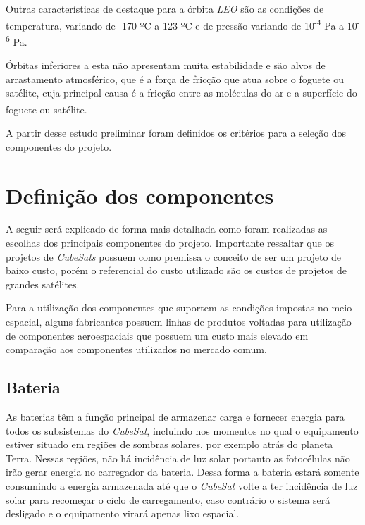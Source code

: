 \documentclass[
	12pt,				%
	openright,			%
	oneside,			%
	a4paper,			%
	english,			%
	french,				%
	spanish,			%
	brazil,				%
	oldfontcommands
	]{abntex2}
\begin{document}
	Outras características de destaque para a órbita \textit{LEO} são as condições de temperatura, variando de -170 ºC a 123 ºC e de pressão variando de 10\textsuperscript{-4} Pa a 10\textsuperscript{-6} Pa.\textsuperscript{\cite{LEO}}
	
	Órbitas inferiores a esta não apresentam muita estabilidade e são alvos de arrastamento atmosférico, que é a força de fricção que atua sobre o foguete ou satélite, cuja principal causa é a fricção entre as moléculas do ar e a superfície do foguete ou satélite.\textsuperscript{\cite{NASA2}}
	
	A partir desse estudo preliminar foram definidos os critérios para a seleção dos componentes do projeto.	
	
\section[Definição dos componentes]{Definição dos componentes}

	A seguir será explicado de forma mais detalhada como foram realizadas as escolhas dos principais componentes do projeto. Importante ressaltar que os projetos de \textit{CubeSats} possuem como premissa o conceito de ser um projeto de baixo custo, porém o referencial do custo utilizado são os custos de projetos de grandes satélites.
	
	Para a utilização dos componentes que suportem as condições impostas  no meio espacial, alguns fabricantes possuem linhas de produtos voltadas para utilização de componentes aeroespaciais que possuem um custo mais elevado em comparação aos componentes utilizados no mercado comum.

\subsection[Bateria]{Bateria} \label{Sec_Bateria}

	
	As baterias têm a função principal de armazenar carga e fornecer energia para todos os subsistemas do \textit{CubeSat}, incluindo nos momentos no qual o equipamento estiver situado em regiões de sombras solares, por exemplo atrás do planeta Terra. Nessas regiões, não há incidência de luz solar portanto as fotocélulas não irão gerar energia no carregador da bateria. Dessa forma a bateria estará somente consumindo a energia armazenada até que o \textit{CubeSat} volte a ter incidência de luz solar para recomeçar o ciclo de carregamento, caso contrário o sistema será desligado e o equipamento virará apenas lixo espacial.	
	
\end{document}
